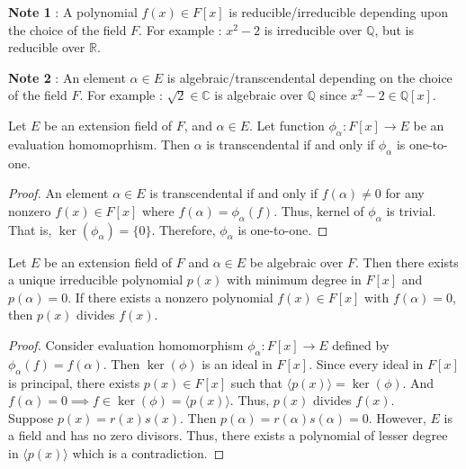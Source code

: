 \textbf{Note 1} : A polynomial $f(x) \in F[x]$ is reducible/irreducible depending upon the choice of the field $F$. For example : $x^2-2$ is irreducible over $\mathbb{Q}$, but is reducible over $\mathbb{R}$.

\textbf{Note 2} : An element $\alpha \in E$ is algebraic/transcendental depending on the choice of the field $F$. For example : $\sqrt{2} \in \mathbb{C}$ is algebraic over $\mathbb{Q}$ since $x^2-2 \in \mathbb{Q}[x]$.

\begin{theorem}
	Let $E$ be an extension field of $F$, and $\alpha \in E$. Let function $\phi_\alpha : F[x] \to E$ be an evaluation homomoprhism. Then $\alpha$ is transcendental  if and only if $\phi_\alpha$ is one-to-one.
\end{theorem}
\begin{proof}
	An element $\alpha \in E$ is transcendental if and only if $f(\alpha) \ne 0$ for any nonzero $f(x) \in F[x]$ where $f(\alpha) = \phi_\alpha(f)$. Thus, kernel of $\phi_\alpha$ is trivial. That is, $\ker(\phi_\alpha) = \{ 0 \}$. Therefore, $\phi_\alpha$ is one-to-one.
\end{proof}

\begin{theorem}
	Let $E$ be an extension field of $F$ and $\alpha \in E$ be algebraic over $F$. Then there exists a unique irreducible polynomial $p(x)$ with minimum degree in $F[x]$ and $p(\alpha) = 0$. If there exists a nonzero polynomial $f(x) \in F[x]$ with $f(\alpha) = 0$, then $p(x)$ divides $f(x)$.
\end{theorem}
\begin{proof}
	Consider evaluation homomorphism $\phi_\alpha : F[x] \to E$ defined by $\phi_\alpha(f) = f(\alpha)$. Then $\ker(\phi)$ is an ideal in $F[x]$. Since every ideal in $F[x]$ is principal, there exists $p(x) \in F[x]$ such that $\langle p(x) \rangle = \ker(\phi)$. And $f(\alpha) = 0 \implies f \in \ker(\phi) = \langle p(x) \rangle$. Thus, $p(x)$ divides $f(x)$.\\

	Suppose $p(x) = r(x)s(x)$. Then $p(\alpha) = r(\alpha)s(\alpha) = 0$. However, $E$ is a field and has no zero divisors. Thus, there exists a polynomial of lesser degree in $\langle p(x) \rangle$ which is a contradiction.
\end{proof}

